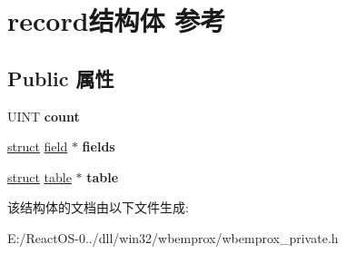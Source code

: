 \hypertarget{structrecord}{}\section{record结构体 参考}
\label{structrecord}
\subsection*{Public 属性}
\begin{DoxyCompactItemize}
\item 
\mbox{\label{structrecord_a668e29d56819ef1dee503c41b336aa39}} 
U\+I\+NT {\bfseries count}
\item 
\mbox{\label{structrecord_ad911e4d5e040d3437c48fc297355d8a1}} 
\hyperlink{interfacestruct}{struct} \hyperlink{structfield}{field} $\ast$ {\bfseries fields}
\item 
\mbox{\label{structrecord_a51356f74784b34bfa1e90d255c5a343e}} 
\hyperlink{interfacestruct}{struct} \hyperlink{structtable}{table} $\ast$ {\bfseries table}
\end{DoxyCompactItemize}


该结构体的文档由以下文件生成\+:\begin{DoxyCompactItemize}
\item 
E\+:/\+React\+O\+S-\/0../dll/win32/wbemprox/wbemprox\+\_\+private.\+h\end{DoxyCompactItemize}
